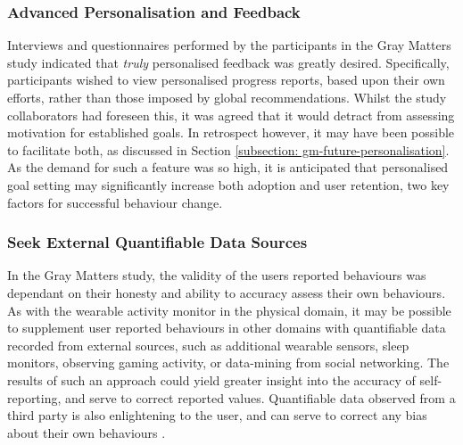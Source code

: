 \subsubsection{Advanced Personalisation and Feedback}
Interviews and questionnaires performed by the participants in the Gray Matters study indicated that \textit{truly} personalised feedback was greatly desired. Specifically, participants wished to view personalised progress reports, based upon their own efforts, rather than those imposed by global recommendations. Whilst the study collaborators had foreseen this, it was agreed that it would detract from assessing motivation for established goals. In retrospect however, it may have been possible to facilitate both, as discussed in Section \ref{subsection: gm-future-personalisation}. As the demand for such a feature was so high, it is anticipated that personalised goal setting may significantly increase both adoption and user retention, two key factors for successful behaviour change.

\subsubsection{Seek External Quantifiable Data Sources}
In the Gray Matters study, the validity of the users reported behaviours was dependant on their honesty and ability to accuracy assess their own behaviours. As with the wearable activity monitor in the physical domain, it may be possible to supplement user reported behaviours in other domains with quantifiable data recorded from external sources, such as additional wearable sensors, sleep monitors, observing gaming activity, or data-mining from social networking. The results of such an approach could yield greater insight into the accuracy of self-reporting, and serve to correct reported values. Quantifiable data observed from a third party is also enlightening to the user, and can serve to correct any bias about their own behaviours \cite{Elliott2014}.

